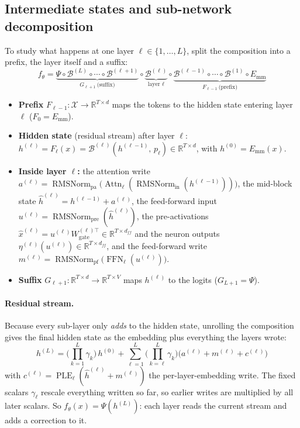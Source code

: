 \documentclass[10pt,a4paper]{article}
\newcommand{\op}[1]{\operatorname{#1}}
\theoremstyle{definition}
\begin{document}
\subsection{Intermediate states and sub-network decomposition}
To study what happens at one layer $\ell\in\{1,\dots,L\}$, split the composition into a prefix, the layer itself and a suffix:
\begin{equation}
  f_\theta = \underbrace{\Psi\circ\mathcal{B}^{(L)}\circ\cdots\circ\mathcal{B}^{(\ell+1)}}_{G_{\ell+1}\ \text{(suffix)}}\circ\underbrace{\mathcal{B}^{(\ell)}}_{\text{layer }\ell}\circ\underbrace{\mathcal{B}^{(\ell-1)}\circ\cdots\circ\mathcal{B}^{(1)}\circ E_{\mathrm{mm}}}_{F_{\ell-1}\ \text{(prefix)}}
\end{equation}
\begin{itemize}
\item \textbf{Prefix} $F_{\ell-1}:\mathcal{X}\to\mathbb{R}^{T\times d}$ maps the tokens to the hidden state entering layer $\ell$ ($F_0=E_{\mathrm{mm}}$).
\item \textbf{Hidden state} (residual stream) after layer $\ell$: $h^{(\ell)}=F_\ell(x)=\mathcal{B}^{(\ell)}(h^{(\ell-1)},\,p_\ell)\in\mathbb{R}^{T\times d}$, with $h^{(0)}=E_{\mathrm{mm}}(x)$.
\item \textbf{Inside layer $\ell$:} the attention write $a^{(\ell)}=\op{RMSNorm}_{\mathrm{pa}}\big(\op{Attn}_\ell(\op{RMSNorm}_{\mathrm{in}}(h^{(\ell-1)}))\big)$, the mid-block state $\hat h^{(\ell)}=h^{(\ell-1)}+a^{(\ell)}$, the feed-forward input $u^{(\ell)}=\op{RMSNorm}_{\mathrm{pre}}(\hat h^{(\ell)})$, the pre-activations $\hat x^{(\ell)}=u^{(\ell)}W^{(\ell)\top}_{\mathrm{gate}}\in\mathbb{R}^{T\times d_{ff}}$ and the neuron outputs $\eta^{(\ell)}(u^{(\ell)})\in\mathbb{R}^{T\times d_{ff}}$, and the feed-forward write $m^{(\ell)}=\op{RMSNorm}_{\mathrm{pf}}\big(\op{FFN}_\ell(u^{(\ell)})\big)$.
\item \textbf{Suffix} $G_{\ell+1}:\mathbb{R}^{T\times d}\to\mathbb{R}^{T\times V}$ maps $h^{(\ell)}$ to the logits ($G_{L+1}=\Psi$).
\end{itemize}
\paragraph{Residual stream.} Because every sub-layer only \emph{adds} to the hidden state, unrolling the composition gives the final hidden state as the embedding plus everything the layers wrote:
\begin{equation}
  h^{(L)} = \Big(\prod_{k=1}^{L}\gamma_k\Big)\,h^{(0)} + \sum_{\ell=1}^{L}\Big(\prod_{k=\ell}^{L}\gamma_k\Big)\big(a^{(\ell)}+m^{(\ell)}+c^{(\ell)}\big)
\end{equation}
with $c^{(\ell)}=\op{PLE}_\ell(\hat h^{(\ell)}+m^{(\ell)})$ the per-layer-embedding write.
The fixed scalars $\gamma_\ell$ rescale everything written so far, so earlier writes are multiplied by all later scalars.
So $f_\theta(x)=\Psi(h^{(L)})$: each layer reads the current stream and adds a correction to it.
\end{document}
